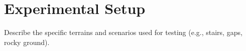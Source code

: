 \section{Experimental Setup}

\begin{outline}
  Describe the specific terrains and scenarios used for testing (e.g., stairs, gaps, rocky ground).
\end{outline}
